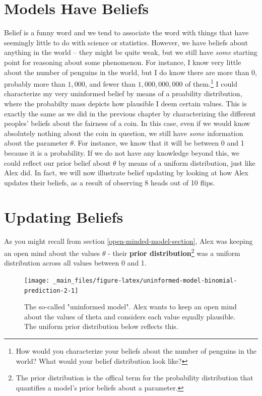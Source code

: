 \documentclass[
]{book}
\begin{document}
\hypertarget{models-have-beliefs}{%
\section{Models Have Beliefs}\label{models-have-beliefs}}

Belief is a funny word and we tend to associate the word with things that have seemingly little to do with science or statistics. However, we have beliefs about anything in the world -- they might be quite weak, but we still have \emph{some} starting point for reasoning about some phenomenon. For instance, I know very little about the number of penguins in the world, but I do know there are more than 0, probably more than \(1{,}000\), and fewer than \(1{,}000{,}000{,}000\) of them.\footnote{How would you characterize your beliefs about the number of penguins in the world? What would your belief distribution look like?} I could characterize my very uninformed belief by means of a proability distribution, where the probabilty mass depicts how plausible I deem certain values. This is exactly the same as we did in the previous chapter by characterizing the different peoples' beliefs about the fairness of a coin. In this case, even if we would know absolutely nothing about the coin in question, we still have \emph{some} information about the parameter \(\theta\). For instance, we know that it will be between 0 and 1 because it is a probability. If we do not have any knowledge beyond this, we could reflect our prior belief about \(\theta\) by means of a uniform distribution, just like Alex did. In fact, we will now illustrate belief updating by looking at how Alex updates their beliefs, as a result of observing 8 heads out of 10 flips.

\hypertarget{updating-beliefs}{%
\section{Updating Beliefs}\label{updating-beliefs}}

As you might recall from section \ref{open-minded-model-section}, Alex was keeping an open mind about the values \(\theta\) - their \textbf{prior distribution}\footnote{The prior distribution is the offical term for the probability distribution that quantifies a model's prior beliefs about a parameter.} was a uniform distribution across all values between 0 and 1.

\begin{figure}

{\centering \texttt{[image: \_main\_files/figure-latex/uninformed-model-binomial-prediction-2-1]} 

}

\caption{The so-called "uninformed model". Alex wants to keep an open mind about the values of theta and considers each value equally plausible. The uniform prior distribution below reflects this.}\label{fig:uninformed-model-binomial-prediction-2}
\end{figure}
\end{document}
